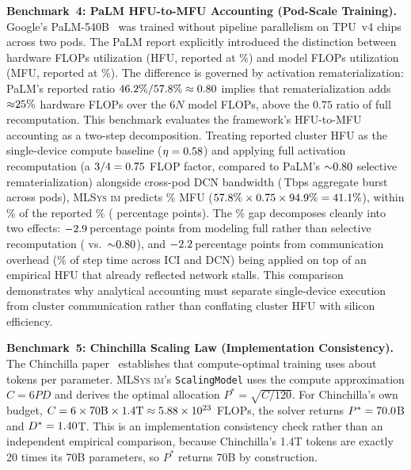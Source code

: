 \documentclass[10pt,twocolumn]{article}
\newcommand{\mlsysim}{\mbox{\textsc{MLSys}\,\textperiodcentered\,\textsc{im}}\xspace}
\begin{document}
\textbf{Benchmark~4: PaLM HFU-to-MFU Accounting (Pod-Scale Training).}
Google's PaLM-540B~\citep{chowdhery2022palm} was trained without pipeline parallelism on \AnchorFourChips{} TPU~v4 chips across two pods. The PaLM report explicitly introduced the distinction between hardware FLOPs utilization (HFU, reported at \AnchorFourReportedHfuPct\%) and model FLOPs utilization (MFU, reported at \AnchorFourReportedMfuPct\%). The difference is governed by activation rematerialization: PaLM's reported ratio $46.2\% / 57.8\% \approx 0.80$ implies that rematerialization adds ${\approx}25\%$ hardware FLOPs over the $6N$ model FLOPs, above the $0.75$ ratio of full recomputation. This benchmark evaluates the framework's HFU-to-MFU accounting as a two-step decomposition. Treating reported cluster HFU as the single-device compute baseline ($\eta = 0.58$) and applying full activation recomputation (a $3/4 = 0.75$ FLOP factor, compared to PaLM's ${\sim}0.80$ selective rematerialization) alongside cross-pod DCN bandwidth (\AnchorFourDcnBurstTbps\,Tbps aggregate burst across pods), \mlsysim predicts \AnchorFourMfuPct\% MFU ($57.8\% \times 0.75 \times 94.9\% = 41.1\%$), within \AnchorFourErrorPct\% of the reported \AnchorFourReportedMfuPct\% (\AnchorFourErrorPoints{} percentage points). The \AnchorFourErrorPct\% gap decomposes cleanly into two effects: $-2.9$\,percentage points from modeling full rather than selective recomputation (\AnchorFourFullRecomputeFactor{} vs.\ ${\sim}0.80$), and $-2.2$\,percentage points from communication overhead (\AnchorFourCommSharePct\% of step time across ICI and DCN) being applied on top of an empirical HFU that already reflected network stalls. This comparison demonstrates why analytical accounting must separate single-device execution from cluster communication rather than conflating cluster HFU with silicon efficiency.

\textbf{Benchmark~5: Chinchilla Scaling Law (Implementation Consistency).}
The Chinchilla paper~\citep{hoffmann2022chinchilla} establishes that compute-optimal training uses about \WallElevenTokensPerParam{} tokens per parameter. \mlsysim's \texttt{ScalingModel} uses the compute approximation $C = 6PD$ and derives the optimal allocation $P^{*} = \sqrt{C/120}$. For Chinchilla's own budget, $C = 6 \times 70\text{B} \times 1.4\text{T} \approx 5.88\times 10^{23}$ FLOPs, the solver returns $P^{*} = 70.0$B and $D^{*} = 1.40$T. This is an implementation consistency check rather than an independent empirical comparison, because Chinchilla's 1.4T tokens are exactly 20 times its 70B parameters, so $P^{*}$ returns 70B by construction.
\end{document}
